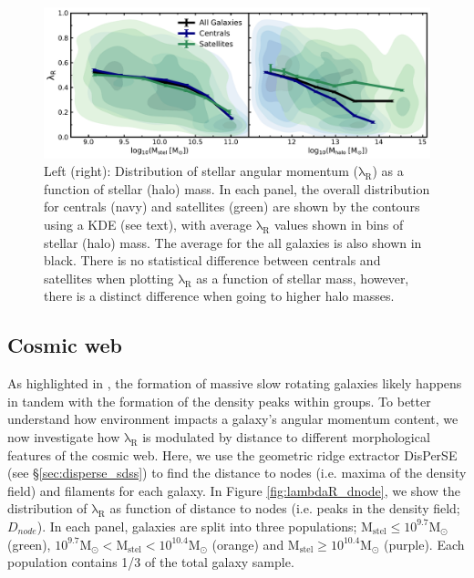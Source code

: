 \begin{figure}
    \centering\includegraphics[width=\linewidth]{thesis/latex/cw_spin/group_lambdaR_mstel_mhalo_comparison.pdf}
    \caption{Left (right): Distribution of stellar angular momentum ($\mathrm{\lambda_R}$) as a function of stellar (halo) mass. In each panel, the overall distribution for centrals (navy) and satellites (green) are shown by the contours using a KDE (see text), with average $\mathrm{\lambda_R}$ values shown in bins of stellar (halo) mass. The average for the all galaxies is also shown in black. There is no statistical difference between centrals and satellites when plotting $\mathrm{\lambda_R}$ as a function of stellar mass, however, there is a distinct difference when going to higher halo masses.}
\label{fig:group_membership_lambdaR}
\end{figure} 

\subsection{Cosmic web}
As highlighted in \citep{graham2019}, the formation of massive slow rotating galaxies likely happens in tandem with the formation of the density peaks within groups. To better understand how environment impacts a galaxy's angular momentum content, we now investigate how $\mathrm{\lambda_R}$ is modulated by distance to different morphological features of the cosmic web. Here, we use the geometric ridge extractor DisPerSE (see \S\ref{sec:disperse_sdss}) to find the distance to nodes (i.e. maxima of the density field) and filaments for each galaxy. In Figure \ref{fig:lambdaR_dnode}, we show the distribution of $\mathrm{\lambda_R}$ as function of distance to nodes (i.e. peaks in the density field; $D_{node}$). In each panel, galaxies are split into three populations; $\mathrm{M_{stel} \leq 10^{9.7}M_{\odot}}$ (green), $\mathrm{10^{9.7}M_{\odot} < M_{stel} < 10^{10.4}M_{\odot}}$ (orange) and $\mathrm{M_{stel} \geq 10^{10.4}M_{\odot}}$ (purple). Each population contains 1/3 of the total galaxy sample. 

